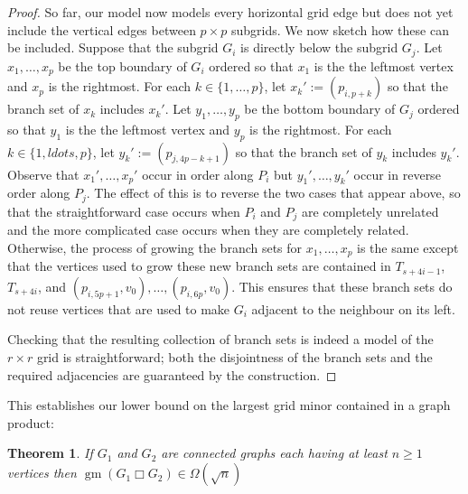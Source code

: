 \documentclass[kpfonts,lotsofwhite]{patmorin}
\newcommand{\boxprod}{\mathbin{\Box}}
\renewcommand{\ge}{\geqslant}
\DeclareMathOperator{\gm}{gm}
\theoremstyle{plain}
\newtheorem{thm}{Theorem}
\theoremstyle{definition}
\begin{document}
\begin{proof}
  So far, our model now models every horizontal grid edge but does not yet include the vertical edges between $p\times p$ subgrids.  We now sketch how these can be included.  Suppose that the subgrid $G_i$ is directly below the subgrid $G_j$.  Let $x_1,\ldots,x_p$ be the top boundary of $G_i$ ordered so that $x_1$ is the the leftmost vertex and $x_p$ is the rightmost.  For each $k\in\{1,\ldots,p\}$, let $x_k':=(p_{i,p+k})$ so that the branch set of $x_k$ includes $x_k'$.  Let $y_1,\ldots,y_p$ be the bottom boundary of $G_j$ ordered so that $y_1$ is the the leftmost vertex and $y_p$ is the rightmost.  For each $k\in\{1,ldots,p\}$, let $y_k':=(p_{j,4p-k+1})$ so that the branch set of $y_k$ includes $y_k'$.  Observe that $x_1',\ldots,x_p'$ occur in order along $P_{i}$ but $y_1',\ldots,y_k'$ occur in reverse order along $P_j$.  The effect of this is to reverse the two cases that appear above, so that the straightforward case occurs when $P_i$ and $P_j$ are completely unrelated and the more complicated case occurs when they are completely related.  Otherwise, the process of growing the branch sets for $x_1,\ldots,x_p$ is the same except that the vertices used to grow these new branch sets are contained in $T_{s+4i-1}$, $T_{s+4i}$, and $(p_{i,5p+1},v_0),\ldots,(p_{i,6p},v_0)$.  This ensures that these branch sets do not reuse vertices that are used to make $G_i$ adjacent to the neighbour on its left.

  Checking that the resulting collection of branch sets is indeed a model of the $r\times r$ grid is straightforward; both the disjointness of the branch sets and the required adjacencies are guaranteed by the construction.
\end{proof}

This establishes our lower bound on the largest grid minor contained in a graph product:

\begin{thm}\label{lower_bound}
  If $G_1$ and $G_2$ are connected graphs each having at least $n\ge 1$ vertices then $\gm(G_1\boxprod G_2)\in\Omega(\sqrt{n})$
\end{thm}
\end{document}
